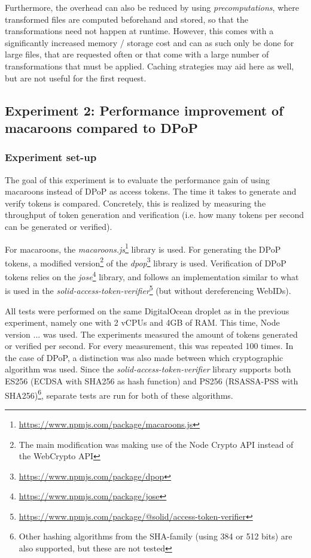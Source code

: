 Furthermore, the overhead can also be reduced by using \textit{precomputations}, where transformed files are computed beforehand and stored, so that the transformations need not happen at runtime. However, this comes with a significantly increased memory / storage cost and can as such only be done for large files, that are requested often or that come with a large number of transformations that must be applied. Caching strategies may aid here as well, but are not useful for the first request. 


\newpage
\subsection{Experiment 2: Performance improvement of macaroons compared to DPoP}
\label{sec:macaroons-performance}
\subsubsection{Experiment set-up}
The goal of this experiment is to evaluate the performance gain of using macaroons instead of \gls{DPoP} as access tokens. The time it takes to generate and verify tokens is compared. Concretely, this is realized by measuring the throughput of token generation and verification (i.e. how many tokens per second can be generated or verified). 

For macaroons, the \textit{macaroons.js}\footnote{\url{https://www.npmjs.com/package/macaroons.js}} library is used. For generating the \gls{DPoP} tokens, a modified version\footnote{The main modification was making use of the Node Crypto API instead of the WebCrypto API} of the \textit{dpop}\footnote{\url{https://www.npmjs.com/package/dpop}} library is used. Verification of \gls{DPoP} tokens relies on the \textit{jose}\footnote{\url{https://www.npmjs.com/package/jose}} library, and follows an implementation similar to what is used in the \textit{solid-access-token-verifier}\footnote{\url{https://www.npmjs.com/package/@solid/access-token-verifier}} (but without dereferencing WebIDs).

All tests were performed on the same DigitalOcean droplet as in the previous experiment, namely one with 2 vCPUs and 4GB of RAM. This time, Node version ... was used. The experiments measured the amount of tokens generated or verified per second. For every measurement, this was repeated 100 times. In the case of \gls{DPoP}, a distinction was also made between which cryptographic algorithm was used. Since the  \textit{solid-access-token-verifier} library supports both ES256 (ECDSA with SHA256 as hash function) and PS256 (RSASSA-PSS with SHA256)\footnote{Other hashing algorithms from the SHA-family (using 384 or 512 bits) are also supported, but these are not tested}, separate tests are run for both of these algorithms.


